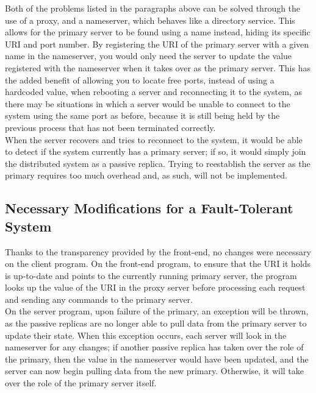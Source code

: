 \documentclass[11pt]{article}
\begin{document}
Both of the problems listed in the paragraphs above can be solved through the 
use of a proxy, and a nameserver, which behaves like a directory service. This 
allows for the primary server to be found using a name instead, hiding 
its specific URI and port number. By registering the URI of the primary 
server with a given name in the nameserver, you would only need the server to 
update the value registered with the nameserver when it takes over as the 
primary server. This has the added benefit of allowing you to locate free 
ports, instead of using a hardcoded value, when rebooting a server and 
reconnecting it to the system, as there may be situations in which a server 
would be unable to connect to the system using the same port as before, because 
it is still being held by the previous process that has not been terminated 
correctly.\\ 

When the server recovers and tries to reconnect to the system, it would be able 
to detect if the system currently has a primary server; if so, it would 
simply join the distributed system as a passive replica. Trying to reestablish 
the server as the primary requires too much overhead and, as such, will not be 
implemented.

\subsection*{Necessary Modifications for a Fault-Tolerant System}
Thanks to the transparency provided by the front-end, no changes were necessary 
on the client program. On the front-end program, to ensure that the URI it 
holds is up-to-date and points to the currently running primary server, the 
program looks up the value of the URI in the proxy server before processing 
each request and sending any commands to the primary server.\\

On the server program, upon failure of the primary, an exception will be 
thrown, as the passive replicas are no longer able to pull data from the 
primary server to update their state. When this exception occurs, each server 
will look in the nameserver for any changes; if another passive replica has 
taken over the role of the primary, then the value in the nameserver would have 
been updated, and the server can now begin pulling data from the new primary. 
Otherwise, it will take over the role of the primary server itself.\\
\end{document}
